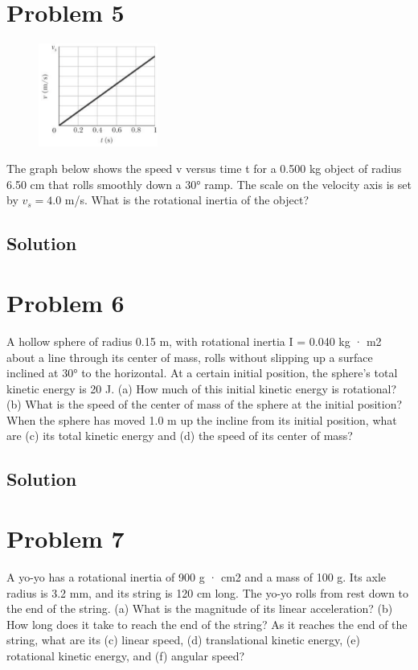 \documentclass[12pt]{article}
\begin{document}
\section{Problem 5}
\begin{figure}
    \vspace{-30pt}
    \includegraphics[width=0.35\textwidth]{graph_5.png} 
\end{figure}
The graph below shows the speed v versus time t for a 0.500 kg object of radius 6.50 cm that rolls smoothly down a 30\unit{\degree} ramp. The scale on the velocity axis is set by $v_s = 4.0$ m/s. What is the rotational inertia of the object?

\subsection{Solution}


\pagebreak
\section{Problem 6}
A hollow sphere of radius 0.15 m, with rotational inertia I = 0.040 kg · m2 about a line through its center of mass, rolls without slipping up a surface inclined at 30° to the horizontal. At a certain initial position, the sphere's total kinetic energy is 20 J. (a) How much of this initial kinetic energy is rotational? (b) What is the speed of the center of mass of the sphere at the initial position? When the sphere has moved 1.0 m up the incline from its initial position, what are (c) its total kinetic energy and (d) the speed of its center of mass?

\subsection{Solution}


\pagebreak
\section{Problem 7}
A yo-yo has a rotational inertia of 900 g · cm2 and a mass of 100 g. Its axle radius is 3.2 mm, and its string is 120 cm long. The yo-yo rolls from rest down to the end of the string. (a) What is the magnitude of its linear acceleration? (b) How long does it take to reach the end of the string? As it reaches the end of the string, what are its (c) linear speed, (d) translational kinetic energy, (e) rotational kinetic energy, and (f) angular speed?
\end{document}
